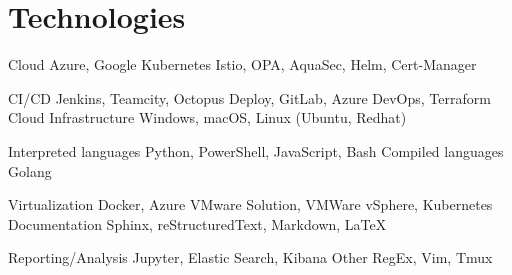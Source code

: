 \section{Technologies}

\cvcomputer %
  {Cloud}
    {Azure, Google}
  {Kubernetes}
    {Istio, OPA, AquaSec, Helm, Cert-Manager}

  \cvcomputer %
  {CI/CD}
    {Jenkins, Teamcity, Octopus Deploy, GitLab, Azure DevOps, Terraform Cloud}
  {Infrastructure}
    {Windows, macOS, Linux (Ubuntu, Redhat)}

\cvcomputer %
  {Interpreted languages}
    {Python, PowerShell, JavaScript, Bash}
  {Compiled languages}
    {Golang}

\cvcomputer %
  {Virtualization}
    {Docker, Azure VMware Solution, VMWare vSphere, Kubernetes}
  {Documentation}
    {Sphinx, reStructuredText, Markdown, LaTeX}

\cvcomputer %
  {Reporting/Analysis}
    {Jupyter, Elastic Search, Kibana}
  {Other}
    {RegEx, Vim, Tmux}

\closesection{}
